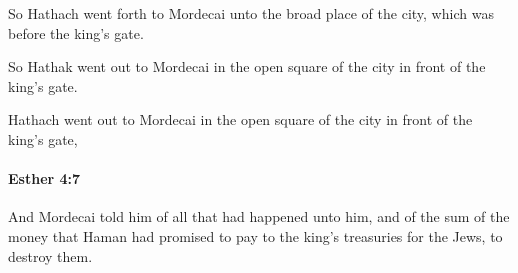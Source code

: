			\begin{versebox}
					\item[BHS] 
					\item[ASV] So Hathach went forth to Mordecai unto the broad place of the city, which was before the king's gate.
					\item[NIV] So Hathak went out to Mordecai in the open square of the city in front of the king’s gate.
					\item[NRSV] Hathach went out to Mordecai in the open square of the city in front of the king’s gate,
			\end{versebox}

		\paragraph{Esther 4:7} %
			\label{ESTHER-4-7}

			And Mordecai told him of all that had happened unto him, and of the sum of the money that Haman had promised to pay to the king’s treasuries for the Jews, to destroy them.


